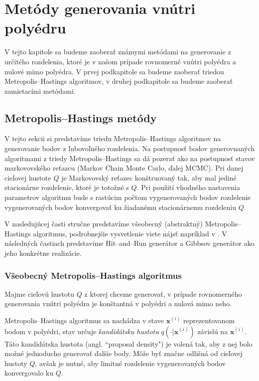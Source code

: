 \chapter{Metódy generovania vnútri polyédru}

V tejto kapitole sa budeme zaoberať známymi metódami na generovanie z určitého rozdelenia, ktoré je v našom prípade rovnomerné vnútri polyédra a nulové mimo polyédra. V prvej podkapitole sa budeme zaoberať triedou Metropolis--Hastings algoritmov, v druhej podkapitole sa budeme zaoberať zamietacími metódami.

\section{Metropolis--Hastings metódy}

V tejto sekcii si predstavíme triedu Metropolis--Hastings algoritmov na generovanie bodov z ľubovoľného rozdelenia. Na postupnosť bodov generovnaných algoritmami z triedy Metropolis--Hastings sa dá pozerať ako na postupnosť stavov markovovského reťazcu (Markov Chain Monte Carlo, ďalej MCMC). Pri danej cieľovej hustote $Q$ je Markovovský reťazec konštruovaný tak, aby mal jediné stacionárne rozdelenie, ktoré je totožné s $Q$. Pri použití vhodného nastavenia parametrov algoritmu bude s rastúcim počtom vygenerovaných bodov rozdelenie vygenerovaných bodov konvergovať ku žiadanému stacionárnemu rozdeleniu $Q$.

V nasledujúcej časti stručne predstavíme všeobecný (abstraktný) Metropolis--Hastings algoritmus, podrobnejšie vysvetlenie viete nájsť napríklad v \cite{metropolis-hastings_chib}. V následných častiach predstavíme Hit--and--Run generátor a Gibbsov generátor ako jeho konkrétne realizácie.

\subsection{Všeobecný Metropolis--Hastings algoritmus}

Majme cieľovú hustotu $Q$ z ktorej chceme generovať, v prípade rovnomerného generovania vnútri polyédra je konštantná v polyédri a nulová mimo neho.

Metropolis--Hastings algoritmus \cite{metropolis-hastings_chib} sa nachádza v stave $\mathbf x^{(i)}$ reprezentovanom bodom v polyédri, stav určuje \textit{kandidátsku hustotu} $q(\cdot | \mathbf x^{(i)})$ závislú na $\mathbf x^{(i)}$. Táto kandidátska hustota (angl. ``proposal density") je volená tak, aby z nej bolo možné jednoducho generovať ďalšie body. Môže byť značne odlišná od cieľovej hustoty $Q$, avšak je nutné, aby limitné rozdelenie vygenerovaných bodov konvergovalo ku $Q$.

